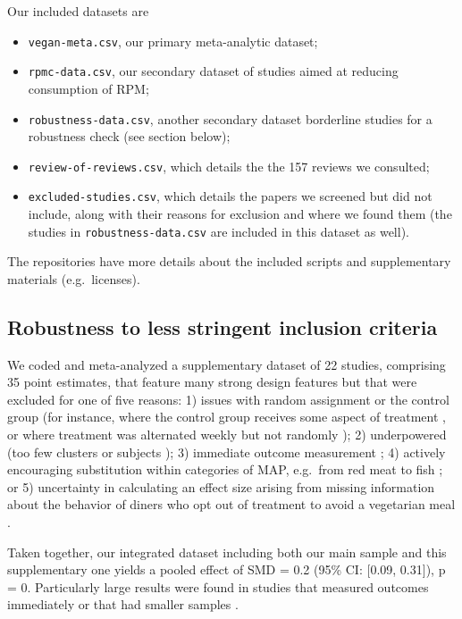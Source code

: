 \documentclass[sn-nature,referee,pdflatex]{sn-jnl}
\begin{document}
Our included datasets are

\begin{itemize}
\item
  \texttt{vegan-meta.csv}, our primary meta-analytic dataset;
\item
  \texttt{rpmc-data.csv}, our secondary dataset of studies aimed at
  reducing consumption of RPM;
\item
  \texttt{robustness-data.csv}, another secondary dataset borderline
  studies for a robustness check (see section below);
\item
  \texttt{review-of-reviews.csv}, which details the the 157 reviews we
  consulted;
\item
  \texttt{excluded-studies.csv}, which details the papers we screened
  but did not include, along with their reasons for exclusion and where
  we found them (the studies in \texttt{robustness-data.csv} are
  included in this dataset as well).
\end{itemize}

The repositories have more details about the included scripts and
supplementary materials (e.g.~licenses).

\subsection{Robustness to less stringent inclusion
criteria}\label{Sec5.1.1}

We coded and meta-analyzed a supplementary dataset of 22 studies,
comprising 35 point estimates, that feature many strong design features
but that were excluded for one of five reasons: 1) issues with random
assignment or the control group (for instance, where the control group
receives some aspect of treatment \citep{piazza2022}, or where treatment
was alternated weekly but not randomly \citep{garnett2020}); 2)
underpowered (too few clusters \citep{reinders2017} or subjects
\citep{lentz2019}); 3) immediate outcome measurement
\citep{dannenberg2023, sparkman2017, griesoph2021, hansen2021}; 4)
actively encouraging substitution within categories of MAP, e.g.~from
red meat to fish \citep{celis2017, johansen2009}; or 5) uncertainty in
calculating an effect size arising from missing information about the
behavior of diners who opt out of treatment to avoid a vegetarian meal
\citep{betterfoodfoundation2023}.

Taken together, our integrated dataset including both our main sample
and this supplementary one yields a pooled effect of SMD = 0.2 (95\% CI:
{[}0.09, 0.31{]}), p = 0. Particularly large results were found in
studies that measured outcomes immediately \citep{hansen2021} or that
had smaller samples \citep{lentz2020}.
\end{document}
